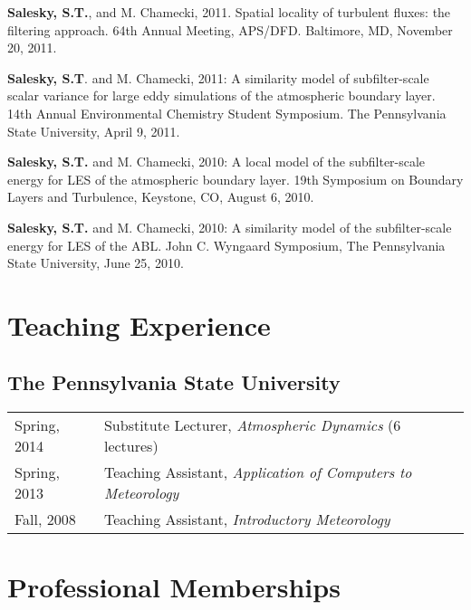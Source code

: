 \documentclass[11pt,letterpaper]{article}
\begin{document}
\textbf{Salesky, S.T.}, and M. Chamecki, 2011. Spatial locality of turbulent fluxes: the filtering approach. 64th Annual Meeting, APS/DFD. Baltimore, MD, November 20, 2011. 

\textbf{Salesky, S.T}. and M. Chamecki, 2011: A similarity model of subfilter-scale scalar variance for large eddy simulations of the atmospheric boundary layer. 14th Annual Environmental Chemistry Student Symposium. The Pennsylvania State University, April 9, 2011. 

\textbf{Salesky, S.T.} and M. Chamecki, 2010: A local model of the subfilter-scale energy for LES of the atmospheric boundary layer. 19th Symposium on Boundary Layers and Turbulence, Keystone, CO, August 6, 2010. 

\textbf{Salesky, S.T.} and M. Chamecki, 2010: A similarity model of the subfilter-scale energy for LES of the ABL. John C. Wyngaard Symposium, The Pennsylvania State University, June 25, 2010. 

\section*{Teaching Experience} 
\subsection*{The Pennsylvania State University}

\begin{tabular}{l l}
Spring, 2014 & Substitute Lecturer, \textit{Atmospheric Dynamics} (6 lectures) \\
Spring, 2013 & Teaching Assistant, \textit{Application of Computers to Meteorology} \\
Fall, 2008 & Teaching Assistant, \textit{Introductory Meteorology} \\
\end{tabular}


\section*{Professional Memberships} 
\end{document}
